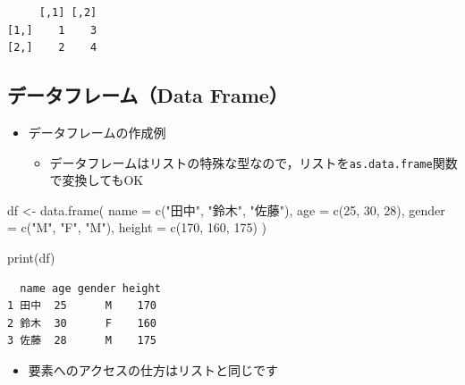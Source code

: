 \documentclass[
  a4paper,
]{ltjsbook}
\newenvironment{Shaded}{\begin{snugshade}}{\end{snugshade}}
\newcommand{\AttributeTok}[1]{\textcolor[rgb]{0.40,0.45,0.13}{#1}}
\newcommand{\DecValTok}[1]{\textcolor[rgb]{0.68,0.00,0.00}{#1}}
\newcommand{\FunctionTok}[1]{\textcolor[rgb]{0.28,0.35,0.67}{#1}}
\newcommand{\NormalTok}[1]{\textcolor[rgb]{0.00,0.23,0.31}{#1}}
\newcommand{\OtherTok}[1]{\textcolor[rgb]{0.00,0.23,0.31}{#1}}
\newcommand{\SpecialCharTok}[1]{\textcolor[rgb]{0.37,0.37,0.37}{#1}}
\newcommand{\StringTok}[1]{\textcolor[rgb]{0.13,0.47,0.30}{#1}}
\providecommand{\tightlist}{%
  \setlength{\itemsep}{0pt}\setlength{\parskip}{0pt}}\usepackage{longtable,booktabs,array}
\begin{document}
\begin{verbatim}
     [,1] [,2]
[1,]    1    3
[2,]    2    4
\end{verbatim}

\subsection{データフレーム（Data
Frame）}\label{ux30c7ux30fcux30bfux30d5ux30ecux30fcux30e0data-frame}

\begin{itemize}
\tightlist
\item
  データフレームの作成例

  \begin{itemize}
  \tightlist
  \item
    データフレームはリストの特殊な型なので，リストを\texttt{as.data.frame}関数で変換してもOK
  \end{itemize}
\end{itemize}

\begin{Shaded}
\begin{Highlighting}[]
\NormalTok{df }\OtherTok{\textless{}{-}} \FunctionTok{data.frame}\NormalTok{(}
    \AttributeTok{name =} \FunctionTok{c}\NormalTok{(}\StringTok{"田中"}\NormalTok{, }\StringTok{"鈴木"}\NormalTok{, }\StringTok{"佐藤"}\NormalTok{),}
    \AttributeTok{age =} \FunctionTok{c}\NormalTok{(}\DecValTok{25}\NormalTok{, }\DecValTok{30}\NormalTok{, }\DecValTok{28}\NormalTok{),}
    \AttributeTok{gender =} \FunctionTok{c}\NormalTok{(}\StringTok{"M"}\NormalTok{, }\StringTok{"F"}\NormalTok{, }\StringTok{"M"}\NormalTok{),}
    \AttributeTok{height =} \FunctionTok{c}\NormalTok{(}\DecValTok{170}\NormalTok{, }\DecValTok{160}\NormalTok{, }\DecValTok{175}\NormalTok{)}
\NormalTok{)}

\FunctionTok{print}\NormalTok{(df)}
\end{Highlighting}
\end{Shaded}

\begin{verbatim}
  name age gender height
1 田中  25      M    170
2 鈴木  30      F    160
3 佐藤  28      M    175
\end{verbatim}

\begin{itemize}
\tightlist
\item
  要素へのアクセスの仕方はリストと同じです
\end{itemize}

\begin{Shaded}
\end{Shaded}
\end{document}
